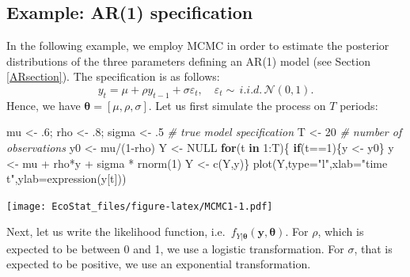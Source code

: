 \documentclass[
  12pt,
]{book}
\newenvironment{Shaded}{\begin{snugshade}}{\end{snugshade}}
\newcommand{\AttributeTok}[1]{\textcolor[rgb]{0.77,0.63,0.00}{#1}}
\newcommand{\CommentTok}[1]{\textcolor[rgb]{0.56,0.35,0.01}{\textit{#1}}}
\newcommand{\ConstantTok}[1]{\textcolor[rgb]{0.00,0.00,0.00}{#1}}
\newcommand{\ControlFlowTok}[1]{\textcolor[rgb]{0.13,0.29,0.53}{\textbf{#1}}}
\newcommand{\DecValTok}[1]{\textcolor[rgb]{0.00,0.00,0.81}{#1}}
\newcommand{\FunctionTok}[1]{\textcolor[rgb]{0.00,0.00,0.00}{#1}}
\newcommand{\NormalTok}[1]{#1}
\newcommand{\OtherTok}[1]{\textcolor[rgb]{0.56,0.35,0.01}{#1}}
\newcommand{\SpecialCharTok}[1]{\textcolor[rgb]{0.00,0.00,0.00}{#1}}
\newcommand{\StringTok}[1]{\textcolor[rgb]{0.31,0.60,0.02}{#1}}
\theoremstyle{definition}
\theoremstyle{definition}
\theoremstyle{definition}
\theoremstyle{definition}
\theoremstyle{remark}
\begin{document}
\hypertarget{example-ar1-specification}{%
\subsection{Example: AR(1) specification}\label{example-ar1-specification}}

In the following example, we employ MCMC in order to estimate the posterior distributions of the three parameters defining an AR(1) model (see Section \ref{ARsection}). The specification is as follows:
\[
y_t = \mu + \rho y_{t-1} + \sigma \varepsilon_{t}, \quad \varepsilon_t \sim \,i.i.d.\,\mathcal{N}(0,1).
\]
Hence, we have \({\boldsymbol\theta} = [\mu,\rho,\sigma]\). Let us first simulate the process on \(T\) periods:

\begin{Shaded}
\begin{Highlighting}[]
\NormalTok{mu }\OtherTok{\textless{}{-}}\NormalTok{ .}\DecValTok{6}\NormalTok{; rho }\OtherTok{\textless{}{-}}\NormalTok{ .}\DecValTok{8}\NormalTok{; sigma }\OtherTok{\textless{}{-}}\NormalTok{ .}\DecValTok{5} \CommentTok{\# true model specification}
\NormalTok{T }\OtherTok{\textless{}{-}} \DecValTok{20} \CommentTok{\# number of observations}
\NormalTok{y0 }\OtherTok{\textless{}{-}}\NormalTok{ mu}\SpecialCharTok{/}\NormalTok{(}\DecValTok{1}\SpecialCharTok{{-}}\NormalTok{rho)}
\NormalTok{Y }\OtherTok{\textless{}{-}} \ConstantTok{NULL}
\ControlFlowTok{for}\NormalTok{(t }\ControlFlowTok{in} \DecValTok{1}\SpecialCharTok{:}\NormalTok{T)\{}
  \ControlFlowTok{if}\NormalTok{(t}\SpecialCharTok{==}\DecValTok{1}\NormalTok{)\{y }\OtherTok{\textless{}{-}}\NormalTok{ y0\}}
\NormalTok{  y }\OtherTok{\textless{}{-}}\NormalTok{ mu }\SpecialCharTok{+}\NormalTok{ rho}\SpecialCharTok{*}\NormalTok{y }\SpecialCharTok{+}\NormalTok{ sigma }\SpecialCharTok{*} \FunctionTok{rnorm}\NormalTok{(}\DecValTok{1}\NormalTok{)}
\NormalTok{  Y }\OtherTok{\textless{}{-}} \FunctionTok{c}\NormalTok{(Y,y)\}}
\FunctionTok{plot}\NormalTok{(Y,}\AttributeTok{type=}\StringTok{"l"}\NormalTok{,}\AttributeTok{xlab=}\StringTok{"time t"}\NormalTok{,}\AttributeTok{ylab=}\FunctionTok{expression}\NormalTok{(y[t]))}
\end{Highlighting}
\end{Shaded}

\texttt{[image: EcoStat\_files/figure-latex/MCMC1-1.pdf]}

Next, let us write the likelihood function, i.e.~\(f_{Y|{\boldsymbol\theta}}(\mathbf{y},{\boldsymbol\theta})\). For \(\rho\), which is expected to be between 0 and 1, we use a logistic transformation. For \(\sigma\), that is expected to be positive, we use an exponential transformation.
\end{document}
